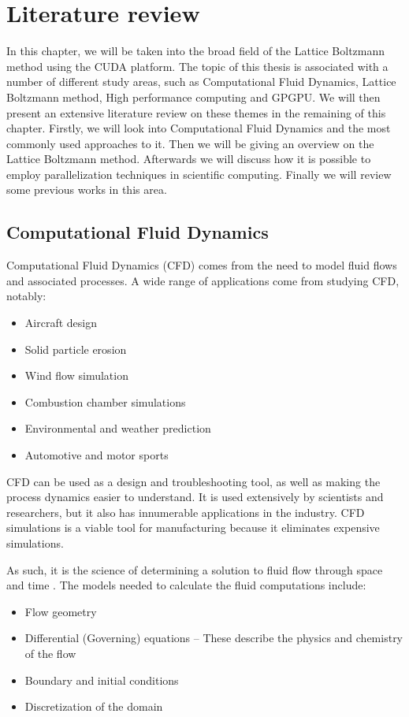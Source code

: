 \documentclass[12pt]{book}
\begin{document}
\chapter{Literature review}
In this chapter, we will be taken into the broad field of the Lattice Boltzmann method using the CUDA platform. The topic of this thesis is associated with a number of different study areas, such as Computational Fluid Dynamics, Lattice Boltzmann method, High performance computing and GPGPU. We will then present an extensive literature review on these themes in the remaining of this chapter. Firstly, we will look into Computational Fluid Dynamics and the most commonly used approaches to it. Then we will be giving an overview on the Lattice Boltzmann method. Afterwards we will discuss how it is possible to employ parallelization techniques in scientific computing. Finally we will review some previous works in this area.
\section{Computational Fluid Dynamics}
Computational Fluid Dynamics (CFD) comes from the need to model fluid flows and associated processes.
A wide range of applications come from studying CFD, notably:
\begin{itemize}
\item Aircraft design \cite{aircraft_cfd}
\item Solid particle erosion \cite{partic_erosion_cfd}
\item Wind flow simulation \cite{wind_flow_cfd}
\item Combustion chamber simulations \cite{combust_cfd}
\item Environmental and weather prediction \cite{weather_pred}
\item Automotive and motor sports \cite{america_cup,race_car_wing}
\end{itemize}

CFD can be used as a design and troubleshooting tool, as well as making the process dynamics easier to understand. It is used extensively by scientists and researchers, but it also has innumerable applications in the industry. CFD simulations is a viable tool for manufacturing because it eliminates expensive simulations.\par
 As such, it is the science of determining a solution to fluid flow through space and time \cite{cfd_present}. The models needed to calculate the fluid computations include:
\begin{itemize}
\item	Flow geometry
\item	Differential (Governing) equations – These describe the physics and chemistry of the flow
\item Boundary and initial conditions
\item	Discretization of the domain
\end{itemize}
\end{document}
